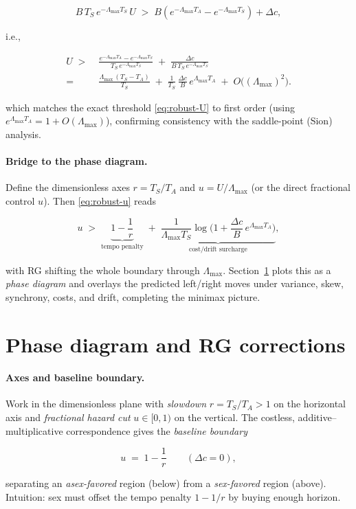 \documentclass[11pt]{article}
\theoremstyle{upright}
\newcommand{\horizon}{\Lambda}
\newcommand{\Lmax}{\horizon^{(T)}_{\max}}
\renewcommand{\Lmax}{\Lambda_{\max}}
\begin{document}
$$
B\,T_S\,e^{-\Lmax T_S}\,U \;>\; B\!\left(e^{-\Lmax T_A}-e^{-\Lmax T_S}\right)+\Delta c,
$$

i.e.,

\[
\begin{aligned}
U \;>\;&
  \frac{e^{-\Lmax T_A}-e^{-\Lmax T_S}}{T_S\,e^{-\Lmax T_S}}
  \;+\; \frac{\Delta c}{B\,T_S\,e^{-\Lmax T_S}}
\\[2pt]
=\;&
  \frac{\Lmax\,(T_S-T_A)}{T_S}
  \;+\; \frac{1}{T_S}\,\frac{\Delta c}{B}\,e^{\Lmax T_A}
  \;+\; O\!\big((\Lmax)^{2}\big).
\end{aligned}
\]


which matches the exact threshold \eqref{eq:robust-U} to first order (using $e^{\Lmax T_A}=1+O(\Lmax)$), confirming consistency with the saddle-point (Sion) analysis.

\paragraph{Bridge to the phase diagram.}
Define the dimensionless axes $r=T_S/T_A$ and $u=U/\Lmax$ (or the direct fractional control $u$). Then \eqref{eq:robust-u} reads

$$
u \;>\; \underbrace{1-\frac{1}{r}}_{\text{tempo penalty}} \;+\; \underbrace{\frac{1}{\Lmax T_S}\log\!\Big(1+\frac{\Delta c}{B}\,e^{\Lmax T_A}\Big)}_{\text{cost/drift surcharge}},
$$

with RG shifting the whole boundary through $\Lmax$. Section~\ref{sec:phase} plots this as a \emph{phase diagram} and overlays the predicted left/right moves under variance, skew, synchrony, costs, and drift, completing the minimax picture.


\section{Phase diagram and RG corrections}
\label{sec:phase}

\paragraph{Axes and baseline boundary.}
Work in the dimensionless plane with \emph{slowdown} $r=T_S/T_A>1$ on the horizontal axis and \emph{fractional hazard cut} $u\in[0,1)$ on the vertical. The costless, additive–multiplicative correspondence gives the \emph{baseline boundary}

$$
u\;=\;1-\frac{1}{r}\qquad(\Delta c=0),
$$

separating an \emph{asex-favored} region (below) from a \emph{sex-favored} region (above). Intuition: sex must offset the tempo penalty $1-1/r$ by buying enough horizon.
\end{document}
